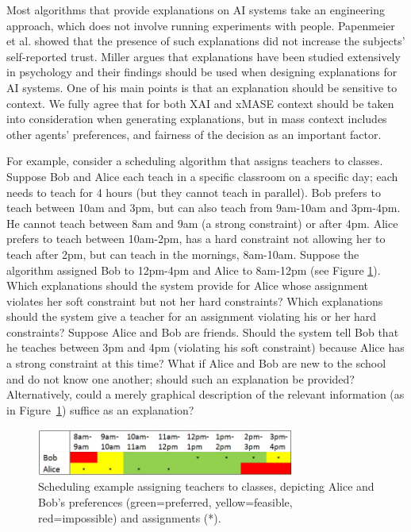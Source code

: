\documentclass[letterpaper]{article} %
\begin{document}
Most algorithms that provide explanations on AI systems take an engineering approach, which does not involve running experiments with people. Papenmeier et al.  showed that the presence of such explanations did not increase the subjects' self-reported trust. Miller  argues that explanations have been studied extensively in psychology and their findings should be used when designing explanations for AI systems. One of his main points is that an explanation should be sensitive to context. We fully agree that for both
\ac{XAI} and \ac{xMASE} context should be taken into consideration when generating explanations, but in \acp{mas} context includes other agents' preferences, and fairness of the decision as an important factor. 

For example, consider a scheduling algorithm that assigns teachers to classes. Suppose Bob and Alice each teach in a specific classroom on a specific day; each needs to teach for 4 hours (but they cannot teach in parallel).
Bob prefers to teach between 10am and 3pm, but can also teach from 9am-10am and 3pm-4pm. He cannot teach between 8am and 9am (a strong constraint) or after 4pm. Alice prefers to teach between 10am-2pm, has a hard constraint not allowing her to teach after 2pm, but can teach in the mornings, 8am-10am. Suppose the algorithm assigned Bob to 12pm-4pm and Alice to 8am-12pm (see Figure \ref{fig:AliceBob}). Which explanations should the system provide for Alice whose assignment violates her soft constraint but not her hard constraints? Which explanations should the system give a teacher for an assignment violating his or her hard constraints? 
Suppose Alice and Bob are friends. Should the system tell Bob that he teaches between 3pm and 4pm (violating his soft constraint) because Alice has a strong constraint at this time? What if Alice and Bob are new to the school and do not know one another; should such an explanation be provided?
Alternatively, could a merely graphical description of the relevant information (as in Figure~\ref{fig:AliceBob}) suffice as an explanation? 
\begin{figure}
    \centering
    \includegraphics[width=8.5cm]{bob.jpg}
        \caption{Scheduling example assigning teachers to classes, depicting Alice and Bob's preferences (green=preferred, yellow=feasible, red=impossible) and assignments (*).}
    \label{fig:AliceBob}
\end{figure}
\end{document}
